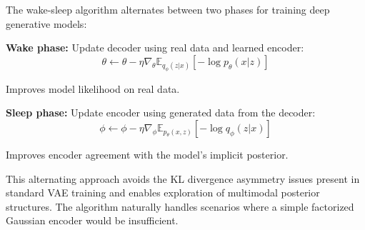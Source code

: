 \documentclass[12pt,a4paper]{article}
\theoremstyle{definition}
\begin{document}
The wake-sleep algorithm alternates between two phases for training deep generative models:

\textbf{Wake phase:} Update decoder using real data and learned encoder:
\[
\theta \gets \theta - \eta \nabla_\theta \mathbb{E}_{q_\phi(z|x)}[-\log p_\theta(x|z)]
\]

Improves model likelihood on real data.

\textbf{Sleep phase:} Update encoder using generated data from the decoder:
\[
\phi \gets \phi - \eta \nabla_\phi \mathbb{E}_{p_\theta(x,z)}[-\log q_\phi(z|x)]
\]

Improves encoder agreement with the model's implicit posterior.

This alternating approach avoids the KL divergence asymmetry issues present in standard VAE training and enables exploration of multimodal posterior structures. The algorithm naturally handles scenarios where a simple factorized Gaussian encoder would be insufficient.
\end{document}
